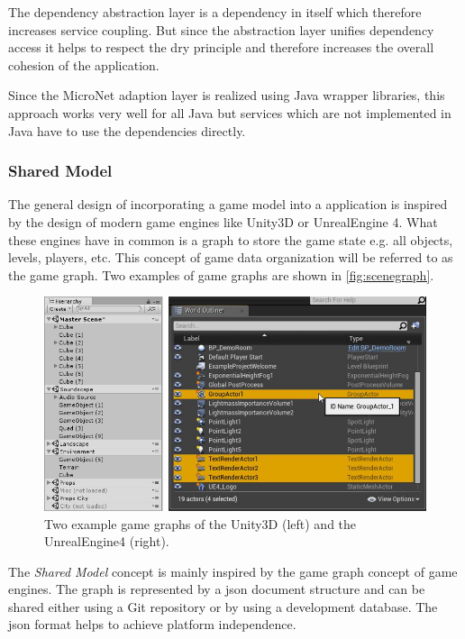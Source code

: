 The dependency abstraction layer is a dependency in itself which therefore
increases service coupling. But since the abstraction layer unifies dependency
access it helps to respect the \gls{dry} principle and therefore
increases the overall cohesion of the application.

Since the MicroNet adaption layer is realized using Java wrapper libraries,
this approach works very well for all Java \mss{} but services which are not
implemented in Java have to use the dependencies directly.

\subsubsection{Shared Model}
\label{subsub:shared_model}

The general design of incorporating a game model into a \mn{} application is
inspired by the design of modern game engines like Unity3D or UnrealEngine 4.
What these engines have in common is a graph to store the game state e.g. all
objects, levels, players, etc. This concept of game data organization will be
referred to as the game graph. Two examples of game graphs are shown in
\autoref{fig:scenegraph}.

\begin{figure}
  \centering
  \includegraphics[width=\textwidth]{images/game_engine/scenegraph}
  \caption{Two example game graphs of the Unity3D (left) and the UnrealEngine4
  (right).}
  \label{fig:scenegraph}
\end{figure}

The \textit{Shared Model} concept is mainly inspired by the game graph concept
of game engines. The graph is represented by a \gls{json} document structure and
can be shared either using a Git repository or by using a development database.
The \gls{json} format helps to achieve platform independence.

